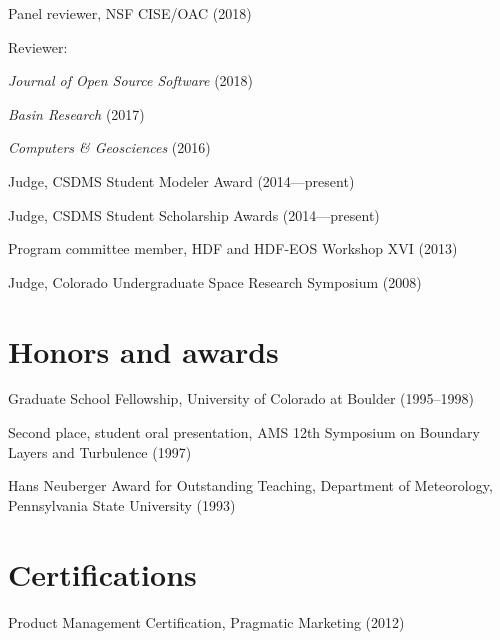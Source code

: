 \documentclass[letterpaper]{resume}
\begin{document}
\vspace{1.0em}
\begin{compactitem}[\itembullet]

  \item Panel reviewer, NSF CISE/OAC (2018)

  \item Reviewer:
    \begin{compactitem}
    \item \textit{Journal of Open Source Software} (2018)
    \item \textit{Basin Research} (2017)
    \item \textit{Computers \& Geosciences} (2016)
    \end{compactitem}

  \item Judge, CSDMS Student Modeler Award (2014---present)

  \item Judge, CSDMS Student Scholarship Awards (2014---present)

  \item Program committee member, HDF and HDF-EOS Workshop XVI (2013)

  \item Judge, Colorado Undergraduate Space Research Symposium (2008)

\end{compactitem}


\section{Honors and awards}

\vspace{1.0em}
\begin{compactitem}[\itembullet]
  \item Graduate School Fellowship, University of Colorado
    at Boulder (1995--1998)
  \item Second place, student oral presentation, AMS 12th
    Symposium on Boundary Layers and Turbulence (1997)
  \item Hans Neuberger Award for Outstanding Teaching,
    Department of Meteorology, Pennsylvania State University (1993)
\end{compactitem}


\section{Certifications}

\vspace{1.0em}
\begin{compactitem}[\itembullet]
  \item Product Management Certification, Pragmatic Marketing (2012)
\end{compactitem}

\end{document}
